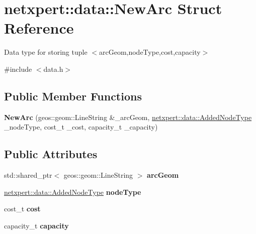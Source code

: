\hypertarget{structnetxpert_1_1data_1_1NewArc}{}\section{netxpert\+:\+:data\+:\+:New\+Arc Struct Reference}
\label{structnetxpert_1_1data_1_1NewArc}


Data type for storing tuple $<$arc\+Geom,node\+Type,cost,capacity$>$  




{\ttfamily \#include $<$data.\+h$>$}

\subsection*{Public Member Functions}
\begin{DoxyCompactItemize}
\item 
{\bfseries New\+Arc} (geos\+::geom\+::\+Line\+String \&\+\_\+arc\+Geom, \hyperlink{namespacenetxpert_1_1data_addf98eb51735356977db0de627cc38c1}{netxpert\+::data\+::\+Added\+Node\+Type} \+\_\+node\+Type, cost\+\_\+t \+\_\+cost, capacity\+\_\+t \+\_\+capacity)\hypertarget{structnetxpert_1_1data_1_1NewArc_ad027a540561bdbe0c04f4b35f24c72ee}{}\label{structnetxpert_1_1data_1_1NewArc_ad027a540561bdbe0c04f4b35f24c72ee}

\end{DoxyCompactItemize}
\subsection*{Public Attributes}
\begin{DoxyCompactItemize}
\item 
std\+::shared\+\_\+ptr$<$ geos\+::geom\+::\+Line\+String $>$ {\bfseries arc\+Geom}\hypertarget{structnetxpert_1_1data_1_1NewArc_a20c64f9c24fd0910c9a901d36536cedb}{}\label{structnetxpert_1_1data_1_1NewArc_a20c64f9c24fd0910c9a901d36536cedb}

\item 
\hyperlink{namespacenetxpert_1_1data_addf98eb51735356977db0de627cc38c1}{netxpert\+::data\+::\+Added\+Node\+Type} {\bfseries node\+Type}\hypertarget{structnetxpert_1_1data_1_1NewArc_a2cc385c4d17c0e9c822ac8c5b638faa3}{}\label{structnetxpert_1_1data_1_1NewArc_a2cc385c4d17c0e9c822ac8c5b638faa3}

\item 
cost\+\_\+t {\bfseries cost}\hypertarget{structnetxpert_1_1data_1_1NewArc_ae23ace08123a63319b6150cfee255bb8}{}\label{structnetxpert_1_1data_1_1NewArc_ae23ace08123a63319b6150cfee255bb8}

\item 
capacity\+\_\+t {\bfseries capacity}\hypertarget{structnetxpert_1_1data_1_1NewArc_a86b7e3e72f67671c0e4a8dc24827ee7e}{}\label{structnetxpert_1_1data_1_1NewArc_a86b7e3e72f67671c0e4a8dc24827ee7e}

\end{DoxyCompactItemize}


